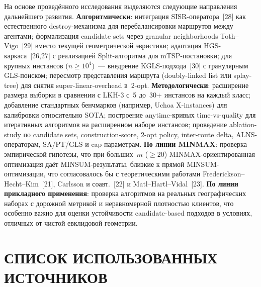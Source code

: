 \documentclass[14pt,a4paper]{extarticle}
\newcommand{\source}[1]{[#1]}
\begin{document}
На основе проведённого исследования выделяются следующие направления дальнейшего развития. \textbf{Алгоритмически}: интеграция SISR-оператора~\source{28} как естественного destroy-механизма для перебалансировки маршрутов между агентами; формализация candidate sets через granular neighborhoods Toth--Vigo~\source{29} вместо текущей геометрической эвристики; адаптация HGS-каркаса~\source{26,27} с реализацией Split-алгоритма для mTSP-постановки; для крупных инстансов ($n \geq 10^4$)~--- внедрение KGLS-подхода~\source{30} с гранулярным GLS-поиском; пересмотр представления маршрута (doubly-linked list или splay-tree) для снятия super-linear-overhead в~2-opt. \textbf{Методологически}: расширение размера выборки в сравнении с LKH-3 с~5 до~30+ инстансов на каждый класс; добавление стандартных бенчмарков (например, Uchoa X-instances) для калибровки относительно SOTA; построение anytime-кривых time-vs-quality для итеративных алгоритмов на расширенном наборе инстансов; проведение ablation-study по candidate sets, construction-score, 2-opt policy, inter-route delta, ALNS-операторам, SA/PT/GLS и cap-параметрам. \textbf{По линии MINMAX}: проверка эмпирической гипотезы, что при больших~$m$ ($\geq 20$) MINMAX-ориентированная оптимизация даёт MINSUM-результаты, близкие к прямой MINSUM-оптимизации, что согласовалось бы с теоретическими работами Frederickson--Hecht--Kim~\source{21}, Carlsson и соавт.~\source{22} и Matl--Hartl--Vidal~\source{23}. \textbf{По линии прикладного применения}: проверка алгоритмов на реальных географических наборах с дорожной метрикой и неравномерной плотностью клиентов, что особенно важно для оценки устойчивости candidate-based подходов в условиях, отличных от чистой евклидовой геометрии.

\newpage
\section*{СПИСОК ИСПОЛЬЗОВАННЫХ ИСТОЧНИКОВ}
\end{document}
